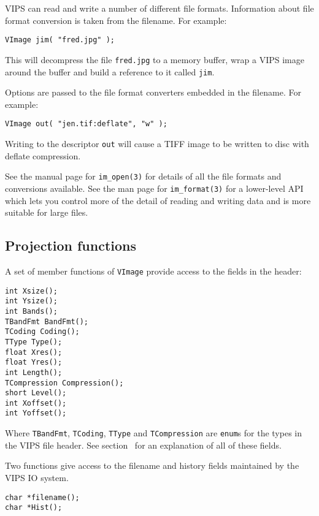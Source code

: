 VIPS can read and write a number of different file formats. Information about
file format conversion is taken from the filename. For example:

\begin{verbatim}
VImage jim( "fred.jpg" );
\end{verbatim}

\noindent
This will decompress the file \verb+fred.jpg+ to a memory buffer, wrap a VIPS
image around the buffer and build a reference to it called \verb+jim+.

Options are passed to the file format converters embedded in the filename. For
example:

\begin{verbatim}
VImage out( "jen.tif:deflate", "w" );
\end{verbatim}

\noindent
Writing to the descriptor \verb+out+ will cause a TIFF image to be written to
disc with deflate compression.

See the manual page for \verb+im_open(3)+ for details of all the file formats
and conversions available. See the man page for \verb+im_format(3)+ for a
lower-level API which lets you control more of the detail of reading and
writing data and is more suitable for large files.

\subsection{Projection functions}

A set of member functions of \verb+VImage+ provide access to the fields in
the header:

\begin{verbatim}
int Xsize();
int Ysize();
int Bands();
TBandFmt BandFmt();
TCoding Coding();
TType Type();
float Xres();
float Yres();
int Length();
TCompression Compression();
short Level();
int Xoffset();
int Yoffset();
\end{verbatim}

\noindent
Where \verb+TBandFmt+, \verb+TCoding+, \verb+TType+ and \verb+TCompression+
are \verb+enum+s for the types in the VIPS file header. See
section~ for an explanation of all of these fields.

Two functions give access to the filename and history
fields maintained by the VIPS IO system.

\begin{verbatim}
char *filename();
char *Hist();
\end{verbatim}

